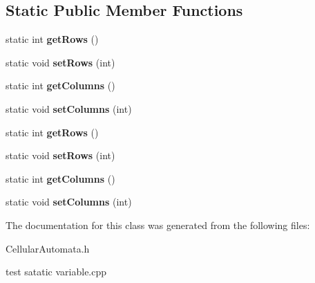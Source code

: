 \subsection*{Static Public Member Functions}
\begin{DoxyCompactItemize}
\item 
\hypertarget{class_cellular_automata_aade36e752c88fbf332fefccf2174f51e}{}static int {\bfseries get\+Rows} ()\label{class_cellular_automata_aade36e752c88fbf332fefccf2174f51e}

\item 
\hypertarget{class_cellular_automata_ab7966b7c4c718846346ce8fb26f7b2a2}{}static void {\bfseries set\+Rows} (int)\label{class_cellular_automata_ab7966b7c4c718846346ce8fb26f7b2a2}

\item 
\hypertarget{class_cellular_automata_afc0faea5817d37cbe8f33b4adaaf0f05}{}static int {\bfseries get\+Columns} ()\label{class_cellular_automata_afc0faea5817d37cbe8f33b4adaaf0f05}

\item 
\hypertarget{class_cellular_automata_a83e295d9ed0cd283a7e8f9072f326c3f}{}static void {\bfseries set\+Columns} (int)\label{class_cellular_automata_a83e295d9ed0cd283a7e8f9072f326c3f}

\item 
\hypertarget{class_cellular_automata_ac2fc0bb2576404e2e3854c2007f03ba1}{}static int {\bfseries get\+Rows} ()\label{class_cellular_automata_ac2fc0bb2576404e2e3854c2007f03ba1}

\item 
\hypertarget{class_cellular_automata_a0ad8217d5f5f4e4f8be8b1782e705ebe}{}static void {\bfseries set\+Rows} (int)\label{class_cellular_automata_a0ad8217d5f5f4e4f8be8b1782e705ebe}

\item 
\hypertarget{class_cellular_automata_ae5b87e972f899cec7d91525c16dfccc3}{}static int {\bfseries get\+Columns} ()\label{class_cellular_automata_ae5b87e972f899cec7d91525c16dfccc3}

\item 
\hypertarget{class_cellular_automata_aba61b73ac1787fb956dec5ec92cd053e}{}static void {\bfseries set\+Columns} (int)\label{class_cellular_automata_aba61b73ac1787fb956dec5ec92cd053e}

\end{DoxyCompactItemize}


The documentation for this class was generated from the following files\+:\begin{DoxyCompactItemize}
\item 
Cellular\+Automata.\+h\item 
test satatic variable.\+cpp\end{DoxyCompactItemize}
